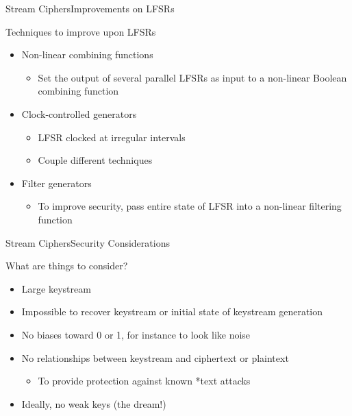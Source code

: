 \documentclass[12pt]{beamer}
\begin{document}
\begin{frame}{Stream Ciphers}{Improvements on LFSRs}
\begin{block}{Techniques to improve upon LFSRs}
\begin{itemize}
	\item Non-linear combining functions 
	\begin{itemize}
		\item Set the output of several parallel LFSRs as input to a non-linear Boolean combining function
	\end{itemize}
	\item Clock-controlled generators
	\begin{itemize}
		\item LFSR clocked at irregular intervals
		\item Couple different techniques
	\end{itemize}
	\item Filter generators
	\begin{itemize}
		\item To improve security, pass entire state of LFSR into a non-linear filtering function
	\end{itemize}
\end{itemize}
\end{block}
\end{frame}

\begin{frame}{Stream Ciphers}{Security Considerations}
\begin{block}{What are things to consider?}
\begin{itemize}
	\item Large keystream
	\item Impossible to recover keystream or initial state of keystream generation
	\item No biases toward 0 or 1, for instance to look like noise
	\item No relationships between keystream and ciphertext or plaintext
	\begin{itemize}
		\item To provide protection against known *text attacks
	\end{itemize}
	\item Ideally, no weak keys (the dream!)
\end{itemize}
\end{block}
\end{frame}
\end{document}
